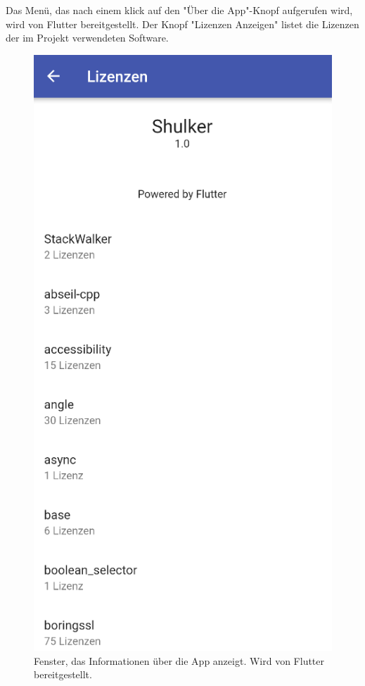 Das Menü, das nach einem klick auf den "Über die App"-Knopf aufgerufen wird, wird von Flutter bereitgestellt.
Der Knopf "Lizenzen Anzeigen" listet die Lizenzen der im Projekt verwendeten Software. 

\begin{figure}[H]
    \begin{center}
        \includegraphics[width=.6\textwidth]{images/mobile/Licences.png}
        \caption{Fenster, das Informationen über die App anzeigt. Wird von Flutter bereitgestellt. }
    \end{center}
\end{figure}